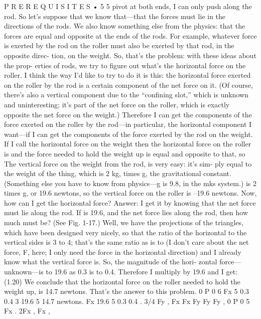 \documentclass[10pt,oneside]{article}
\begin{document}
P R E R E Q U I S I T E S • 5 5 pivot at both ends, I can only push along the rod. So let’s suppose that we know that---that the forces must lie in the directions of the rods. We also know something else from the physics: that the forces are equal and opposite at the ends of the rods. For example, whatever force is exerted by the rod on the roller must also be exerted by that rod, in the opposite direc- tion, on the weight. So, that’s the problem: with these ideas about the prop- erties of rods, we try to figure out what’s the horizontal force on the roller. I think the way I’d like to try to do it is this: the horizontal force exerted on the roller by the rod is a certain component of the net force on it. (Of course, there’s also a vertical component due to the “confining slot,” which is unknown and uninteresting; it’s part of the net force on the roller, which is exactly opposite the net force on the weight.) Therefore I can get the components of the force exerted on the roller by the rod---in particular, the horizontal component I want---if I can get the components of the force exerted by the rod on the weight. If I call the horizontal force on the weight then the horizontal force on the roller is and the force needed to hold the weight up is equal and opposite to that, so The vertical force on the weight from the rod, is very easy: it’s sim- ply equal to the weight of the thing, which is 2 kg, times g, the gravitational constant. (Something else you have to know from physics---g is 9.8, in the mks system.) is 2 times g, or 19.6 newtons, so the vertical force on the roller is –19.6 newtons. Now, how can I get the horizontal force? Answer: I get it by knowing that the net force must lie along the rod. If is 19.6, and the net force lies along the rod, then how much must be? (See Fig. 1-17.) Well, we have the projections of the triangles, which have been designed very nicely, so that the ratio of the horizontal to the vertical sides is 3 to 4; that’s the same ratio as is to (I don’t care about the net force, F, here; I only need the force in the horizontal direction) and I already know what the vertical force is. So, the magnitude of the hori- zontal force---unknown---is to 19.6 as 0.3 is to 0.4. Therefore I multiply by 19.6 and I get: (1.20) We conclude that the horizontal force on the roller needed to hold the weight up, is 14.7 newtons. That’s the answer to this problem. 0 P 0 6 Fx 5 0.3 0.4 3 19.6 5 14.7 newtons. Fx 19.6 5 0.3 0.4 . 3/4 Fy , Fx Fx Fy Fy Fy , 0 P 0 5 Fx . 2Fx , Fx ,\par
\end{document}
